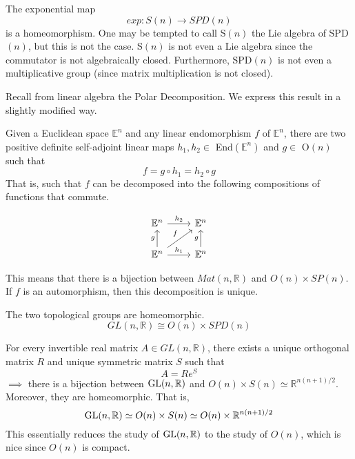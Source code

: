   \begin{lemma}
    The exponential map 
    \begin{equation}
      exp: S(n) \rightarrow SPD(n)
    \end{equation}
    is a homeomorphism. One may be tempted to call S$(n)$ the Lie algebra of SPD$(n)$, but this is not the case. S$(n)$ is not even a Lie algebra since the commutator is not algebraically closed. Furthermore, SPD$(n)$ is not even a multiplicative group (since matrix multiplication is not closed). 
  \end{lemma}

  Recall from linear algebra the Polar Decomposition. We express this result in a slightly modified way. 

  \begin{theorem}
    Given a Euclidean space $\mathbb{E}^n$ and any linear endomorphism $f$ of $\mathbb{E}^n$, there are two positive definite self-adjoint linear maps $h_1, h_2 \in$ End$(\mathbb{E}^n)$ and $g \in$ O$(n)$ such that
    \begin{equation}
      f = g \circ h_1 = h_2 \circ g
    \end{equation}
    That is, such that $f$ can be decomposed into the following compositions of functions that commute. 

    \[\begin{tikzcd}
    \mathbb{E}^n \arrow{r}{h_2} & \mathbb{E}^n \\
    \mathbb{E}^n \arrow{u}{g} \arrow{ur}{f} \arrow{r}{h_1} & \mathbb{E}^n \arrow{u}{g}
    \end{tikzcd}\]

    This means that there is a bijection between $Mat(n, \mathbb{R})$ and $O(n) \times SP(n)$. If $f$ is an automorphism, then this decomposition is unique. 
  \end{theorem}

  \begin{corollary}
    The two topological groups are homeomorphic. 
    \begin{equation}
      GL(n, \mathbb{R}) \cong O(n) \times SPD(n)
    \end{equation}
  \end{corollary}

  \begin{corollary}
    For every invertible real matrix $A \in GL(n, \mathbb{R})$, there exists a unique orthogonal matrix $R$ and unique symmetric matrix $S$ such that
    \begin{equation}
      A = R e^S
    \end{equation}
    $\implies$ there is a bijection between $\GL(n, \mathbb{R})$ and $O(n) \times S(n) \simeq \mathbb{R}^{n(n+1)/2}$. Moreover, they are homeomorphic. That is, 
    \begin{equation}
      \GL(n, \mathbb{R}) \simeq O(n) \times S(n) \simeq O(n) \times \mathbb{R}^{n(n+1)/2}
    \end{equation}
    This essentially reduces the study of $\GL(n, \mathbb{R})$ to the study of $O(n)$, which is nice since $O(n)$ is compact. 
  \end{corollary}

